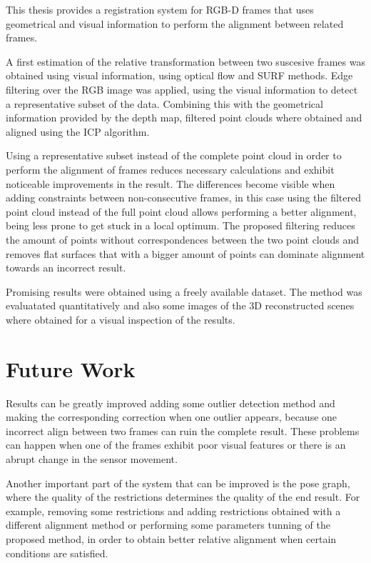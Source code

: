

This thesis provides a registration system for RGB-D frames that uses geometrical and visual information 
to perform the alignment between related frames.  

A first estimation of the relative transformation between two suscesive frames was obtained using 
visual information, using optical flow and SURF methods. Edge filtering over the RGB image was applied, 
using the visual information to detect a representative subset 
of the data. Combining this with the geometrical information provided by the depth map, filtered point clouds 
where obtained and aligned using the ICP algorithm. 

Using a representative subset instead of the complete point cloud in order to perform the alignment of frames 
reduces necessary calculations and exhibit noticeable improvements in the result. The differences become visible 
when adding constraints between non-consecutive frames, in this case using the filtered point cloud instead of 
the full point cloud allows performing a better alignment, being less prone to get stuck in a local optimum. The 
proposed filtering reduces the amount of points without correspondences between the two point clouds and removes 
flat surfaces that with a bigger amount of points can dominate alignment towards an incorrect result.


Promising results were obtained using a freely available dataset. The method was evaluatated quantitatively and 
also some images of the 3D reconstructed scenes where obtained for a visual inspection of the results.

\section{Future Work}

  Results can be greatly improved adding some outlier detection method and making the corresponding correction when one 
outlier appears, because one incorrect align between two frames can ruin the complete result. These problems can happen 
when one of the frames exhibit poor visual features or there is an abrupt change in the sensor movement. 

  Another important part of the system that can be improved is the pose graph, where the quality of the restrictions 
determines the quality of the end result. For example, removing some restrictions and adding restrictions obtained with a 
different alignment method or performing some parameters tunning of the proposed method, in 
order to obtain better relative alignment when certain conditions are satisfied.

